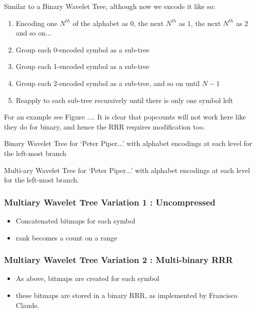 Similar to a Binary Wavelet Tree, although now we encode it like so:

\begin{enumerate}
    \item Encoding one $N^{th}$ of the alphabet as $0$, the next $N^{th}$ as $1$,
    the next $N^{th}$ as $2$ and so on...
    \item Group each 0-encoded symbol as a sub-tree
    \item Group each 1-encoded symbol as a sub-tree
    \item Group each 2-encoded symbol as a sub-tree, and so on until $N-1$
    \item Reapply to each sub-tree recursively until there is only one symbol
    left
\end{enumerate}
For an example see Figure .... It is clear that popcounts will not work
here like they do for binary, and hence the RRR requires modification too.

			{Binary Wavelet Tree for `Peter Piper...' with alphabet
			encodings at each level for the left-most branch}
		
			{Multi-ary Wavelet Tree for `Peter Piper...' with alphabet
			encodings at each level for the left-most branch.}

\subsubsection{Multiary Wavelet Tree Variation 1 : Uncompressed}
\begin{itemize}
\item
  Concatenated bitmaps for each symbol
\item
  rank becomes a count on a range
\end{itemize}

\subsubsection{Multiary Wavelet Tree Variation 2 : Multi-binary RRR}
\begin{itemize}
\item
  As above, bitmaps are created for each symbol
\item
  these bitmaps are stored in a binary RRR, as implemented by
  Francisco Claude.
\end{itemize}